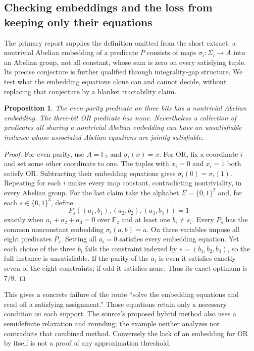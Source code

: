 \documentclass[11pt]{article}
\newtheorem{proposition}{Proposition}
\begin{document}
\subsection{Checking embeddings and the loss from keeping only their equations}
The primary report supplies the definition omitted from the short extract: a nontrivial Abelian embedding of a predicate $P$ consists of maps $\sigma_i:\Sigma_i\to A$ into an Abelian group, not all constant, whose sum is zero on every satisfying tuple. Its precise conjecture is further qualified through integrality-gap structure. We test what the embedding equations alone can and cannot decide, without replacing that conjecture by a blanket tractability claim.
\begin{proposition}
The even-parity predicate on three bits has a nontrivial Abelian embedding. The three-bit OR predicate has none. Nevertheless a collection of predicates all sharing a nontrivial Abelian embedding can have an unsatisfiable instance whose associated Abelian equations are jointly satisfiable.
\end{proposition}
\begin{proof}
For even parity, use $A=\mathbb F_2$ and $\sigma_i(x)=x$. For OR, fix a coordinate $i$ and set some other coordinate to one. The tuples with $x_i=0$ and $x_i=1$ both satisfy OR. Subtracting their embedding equations gives $\sigma_i(0)=\sigma_i(1)$. Repeating for each $i$ makes every map constant, contradicting nontriviality, in every Abelian group.
For the last claim take the alphabet $\Sigma=\{0,1\}^2$ and, for each $s\in\{0,1\}^3$, define
\[
P_s((a_1,b_1),(a_2,b_2),(a_3,b_3))=1
\]
exactly when $a_1+a_2+a_3=0$ over $\mathbb F_2$ and at least one $b_i\ne s_i$. Every $P_s$ has the common nonconstant embedding $\sigma_i(a,b)=a$. On three variables impose all eight predicates $P_s$. Setting all $a_i=0$ satisfies every embedding equation. Yet each choice of the three $b_i$ fails the constraint indexed by $s=(b_1,b_2,b_3)$, so the full instance is unsatisfiable. If the parity of the $a_i$ is even it satisfies exactly seven of the eight constraints; if odd it satisfies none. Thus its exact optimum is $7/8$.
\end{proof}
This gives a concrete failure of the route ``solve the embedding equations and read off a satisfying assignment.'' Those equations retain only a necessary condition on each support. The source's proposed hybrid method also uses a semidefinite relaxation and rounding; the example neither analyzes nor contradicts that combined method. Conversely the lack of an embedding for OR by itself is not a proof of any approximation threshold.
\end{document}
